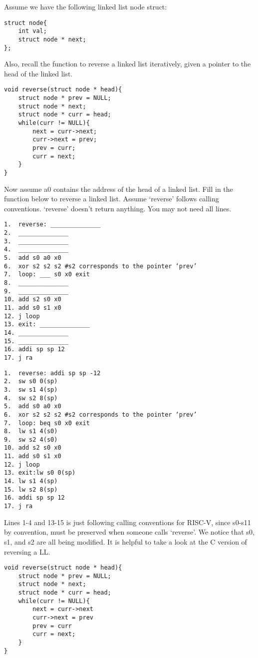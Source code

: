 \begin{blocksection}
\question
Assume we have the following linked list node struct:
\begin{verbatim}
struct node{
    int val;
    struct node * next;
};
\end{verbatim}

Also, recall the function to reverse a linked list iteratively, given a pointer to the head of the linked list. 
\begin{verbatim}
void reverse(struct node * head){
    struct node * prev = NULL; 
    struct node * next;
    struct node * curr = head;
    while(curr != NULL){
        next = curr->next; 
        curr->next = prev;
        prev = curr;
        curr = next; 
    }
}
\end{verbatim}

Now assume a0 contains the address of the head of a linked list.  Fill in the function 
below to reverse a linked list. Assume ‘reverse’ follows calling conventions. ‘reverse’ doesn’t return anything. You may not need all lines. 

\begin{verbatim}
1.  reverse: ______________
2.  ______________
3.  ______________
4.  ______________
5.  add s0 a0 x0 
6.  xor s2 s2 s2 #s2 corresponds to the pointer ‘prev’ 
7.  loop: ___ s0 x0 exit
8.  ______________
9.  ______________
10. add s2 s0 x0 
11. add s0 s1 x0 
12. j loop 
13. exit: ______________
14. ______________
15. ______________
16. addi sp sp 12
17. j ra
\end{verbatim}

\begin{solution}[0.9in]
\begin{verbatim}
1.  reverse: addi sp sp -12
2.  sw s0 0(sp) 
3.  sw s1 4(sp) 
4.  sw s2 8(sp) 
5.  add s0 a0 x0 
6.  xor s2 s2 s2 #s2 corresponds to the pointer ‘prev’ 
7.  loop: beq s0 x0 exit
8.  lw s1 4(s0)
9.  sw s2 4(s0)
10. add s2 s0 x0 
11. add s0 s1 x0 
12. j loop 
13. exit:lw s0 0(sp)
14. lw s1 4(sp)
15. lw s2 8(sp)
16. addi sp sp 12
17. j ra
\end{verbatim}

Lines 1-4 and 13-15 is just following calling conventions for RISC-V, since s0-s11 by convention, must be preserved when someone calls ‘reverse’. We notice that s0, s1, and s2 are all being modified. It is helpful to take a look at the C version of reversing a LL. 

\begin{verbatim}
void reverse(struct node * head){
    struct node * prev = NULL; 
    struct node * next;
    struct node * curr = head;
    while(curr != NULL){
        next = curr->next 
        curr->next = prev
        prev = curr
        curr = next;
    }
}
\end{verbatim}


\end{solution}
\end{blocksection}
